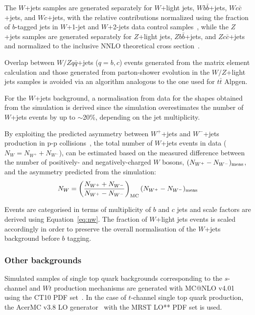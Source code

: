 The $W$+jets samples are generated separately for $W$+light jets, 
$Wb\bar{b}$+jets, $Wc\bar{c}$+jets, and $Wc$+jets, 
with the relative contributions normalized using the fraction 
of $b$-tagged jets in $W$+1-jet and $W$+2-jets data 
control samples~\cite{whf}, while
the $Z$+jets samples are generated separately 
for $Z$+light jets, $Zb\bar{b}$+jets, and $Zc\bar{c}$+jets and
normalized to the inclusive NNLO theoretical cross section~\cite{vjetsxs}.

Overlap between $W/Zq\bar{q}$+jets ($q=b,c$) 
events generated from the matrix element calculation and those
generated from parton-shower evolution in the $W/Z$+light jets
samples is avoided via an algorithm analogous to the one used
for $t\bar{t}$ Alpgen.

For the $W$+jets background, a normalisation from data for the shapes 
obtained from the simulation is derived since the simulation 
overestimates the number of $W$+jets events
by up to $\sim$20\%, depending on the jet multiplicity.

By exploiting the predicted asymmetry between
$W^+$+jets and $W^-$+jets production in p-p collisions~\cite{wasym},
the total number of $W$+jets events in data ($N_W=N_{W^+}+N_{W^-}$), 
can be estimated based on the measured
difference between the number of positively- and negatively-charged $W$
bosons, $(N_{W^+}-N_{W^-})_{\rm meas}$, and the asymmetry predicted from the simulation:
\begin{equation}
N_W = \left(\frac{N_{W^+}+N_{W^-}}{N_{W^+}-N_{W^-}}\right )_{\rm MC}(N_{W^+}-N_{W^-})_{\rm meas}
\label{eq:nw}
\end{equation}

Events are categorised in terms of  multiplicity of $b$ and $c$ jets and scale factors are
derived using Equation~\ref{eq:nw}.
The fraction of $W$+light jets events is scaled accordingly
in order to preserve the overall normalisation of the $W$+jets background before $b$ tagging.


\subsubsection{Other backgrounds}\label{subsec:otherbkg}
Simulated samples of single top quark backgrounds corresponding to the
$s$-channel and $Wt$ production mechanisms are generated with {\sc
MC@NLO} v4.01~\cite{mcatnlo_1,mcatnlo_2,mcatnlo_3} using the {\sc
CT10} PDF set~\cite{ct10}.  In the case of $t$-channel single top
quark production, the {\sc AcerMC} v3.8 LO generator~\cite{acermc}
with the {\sc MRST LO**} PDF set is used.

